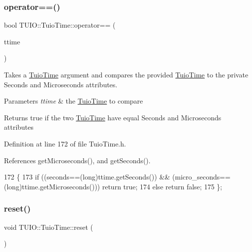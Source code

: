 \subsubsection{\texorpdfstring{operator==()}{operator==()}}
{\footnotesize\ttfamily bool T\+U\+I\+O\+::\+Tuio\+Time\+::operator== (\begin{DoxyParamCaption}\item[{\hyperlink{class_t_u_i_o_1_1_tuio_time}{Tuio\+Time}}]{ttime }\end{DoxyParamCaption})\hspace{0.3cm}{\ttfamily [inline]}}

Takes a \hyperlink{class_t_u_i_o_1_1_tuio_time}{Tuio\+Time} argument and compares the provided \hyperlink{class_t_u_i_o_1_1_tuio_time}{Tuio\+Time} to the private Seconds and Microseconds attributes.


\begin{DoxyParams}{Parameters}
{\em ttime} & the \hyperlink{class_t_u_i_o_1_1_tuio_time}{Tuio\+Time} to compare \\
\hline
\end{DoxyParams}
\begin{DoxyReturn}{Returns}
true if the two \hyperlink{class_t_u_i_o_1_1_tuio_time}{Tuio\+Time} have equal Seconds and Microseconds attributes 
\end{DoxyReturn}


Definition at line 172 of file Tuio\+Time.\+h.



References get\+Microseconds(), and get\+Seconds().


\begin{DoxyCode}
172                                         \{
173             \textcolor{keywordflow}{if} ((seconds==(\textcolor{keywordtype}{long})ttime.getSeconds()) && (micro\_seconds==(\textcolor{keywordtype}{long})ttime.getMicroseconds())) \textcolor{keywordflow}{
      return} \textcolor{keyword}{true};
174             \textcolor{keywordflow}{else} \textcolor{keywordflow}{return} \textcolor{keyword}{false};
175         \};
\end{DoxyCode}
\mbox{\label{class_t_u_i_o_1_1_tuio_time_aeb2bee6eae0ce633f015bf7958a348ac}} 
\subsubsection{\texorpdfstring{reset()}{reset()}}
{\footnotesize\ttfamily void T\+U\+I\+O\+::\+Tuio\+Time\+::reset (\begin{DoxyParamCaption}{ }\end{DoxyParamCaption})\hspace{0.3cm}{\ttfamily [inline]}}

